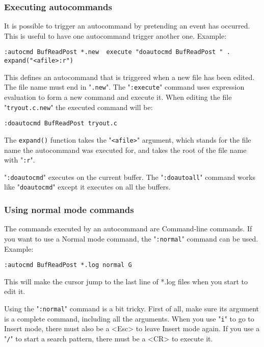 \subsubsection{Executing autocommands}
It is possible to trigger an autocommand by pretending an event has occurred.
This is useful to have one autocommand trigger another one.
Example:

\begin{Verbatim}[samepage=true]
 :autocmd BufReadPost *.new  execute "doautocmd BufReadPost " . expand("<afile>:r")
\end{Verbatim}

This defines an autocommand that is triggered when a new file has been edited.
The file name must end in "\texttt{.new}".
The "\texttt{:execute}" command uses expression evaluation to form a new command and execute it.
When editing the file "\texttt{tryout.c.new}" the executed command will be:

\begin{Verbatim}[samepage=true]
 :doautocmd BufReadPost tryout.c
\end{Verbatim}

The \texttt{expand()} function takes the "\texttt{<afile>}" argument, which stands for the file name the autocommand was executed for, and takes the root of the file name with "\texttt{:r}".

"\texttt{:doautocmd}" executes on the current buffer.
The "\texttt{:doautoall}" command works like "\texttt{doautocmd}" except it executes on all the buffers.

\subsubsection{Using normal mode commands}
The commands executed by an autocommand are Command-line commands.
If you want to use a Normal mode command, the "\texttt{:normal}" command can be used.
Example:

\begin{Verbatim}[samepage=true]
 :autocmd BufReadPost *.log normal G
\end{Verbatim}

This will make the cursor jump to the last line of *.log files when you start to edit it.

Using the "\texttt{:normal}" command is a bit tricky.
First of all, make sure its argument is a complete command, including all the arguments.
When you use "\texttt{i}" to go to Insert mode, there must also be a <Esc> to leave Insert mode again.
If you use a "\texttt{/}" to start a search pattern, there must be a <CR> to execute it.

